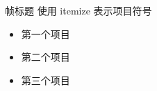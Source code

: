 \begin{frame}{帧标题}
  使用 itemize 表示项目符号
  
  \begin{itemize}
  \item 第一个项目
  \item 第二个项目
  \item 第三个项目
  \end{itemize}
\end{frame}

